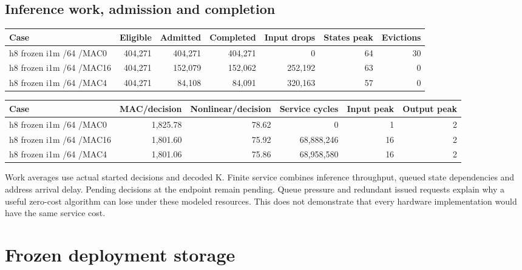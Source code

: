 \documentclass[10pt]{article}
\begin{document}
\clearpage\subsection{Inference work, admission and completion}

\begin{center}
\scriptsize
\begin{tabular}{lrrrrrr}
\toprule
Case & Eligible & Admitted & Completed & Input drops & States peak & Evictions \\
\midrule
h8 frozen i1m /64 /MAC0 & 404,271 & 404,271 & 404,271 & 0 & 64 & 30 \\
h8 frozen i1m /64 /MAC16 & 404,271 & 152,079 & 152,062 & 252,192 & 63 & 0 \\
h8 frozen i1m /64 /MAC4 & 404,271 & 84,108 & 84,091 & 320,163 & 57 & 0 \\
\bottomrule
\end{tabular}
\end{center}

\begin{center}
\scriptsize
\begin{tabular}{lrrrrr}
\toprule
Case & MAC/decision & Nonlinear/decision & Service cycles & Input peak & Output peak \\
\midrule
h8 frozen i1m /64 /MAC0 & 1,825.78 & 78.62 & 0 & 1 & 2 \\
h8 frozen i1m /64 /MAC16 & 1,801.60 & 75.92 & 68,888,246 & 16 & 2 \\
h8 frozen i1m /64 /MAC4 & 1,801.06 & 75.86 & 68,958,580 & 16 & 2 \\
\bottomrule
\end{tabular}
\end{center}

Work averages use actual started decisions and decoded K. Finite service combines inference throughput, queued state dependencies and address arrival delay. Pending decisions at the endpoint remain pending. Queue pressure and redundant issued requests explain why a useful zero-cost algorithm can lose under these modeled resources. This does not demonstrate that every hardware implementation would have the same service cost.

\section{Frozen deployment storage}
\end{document}
